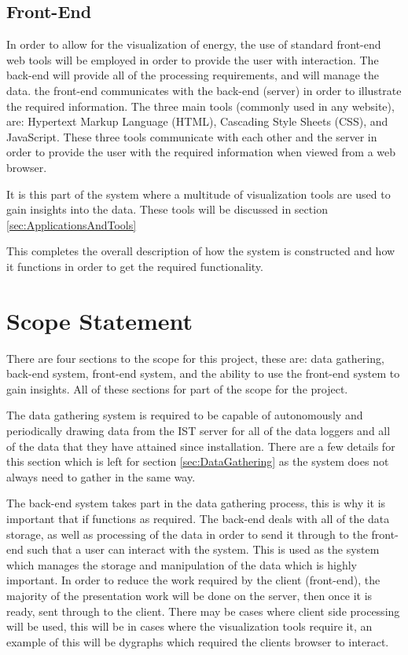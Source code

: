 \documentclass[12pt,onecolumn]{IEEEtran}
\begin{document}
\subsection{Front-End} \label{sec:FrontEnd}
In order to allow for the visualization of energy, the use of standard front-end web tools will be employed in order to provide the user with interaction. 
The back-end will provide all of the processing requirements, and will manage the data. the front-end communicates with the back-end (server) in order to illustrate the required information.
The three main tools (commonly used in any website), are: Hypertext Markup Language (HTML), Cascading Style Sheets (CSS), and JavaScript. 
These three tools communicate with each other and the server in order to provide the user with the required information when viewed from a web browser. 

It is this part of the system where a multitude of visualization tools are used to gain insights into the data. These tools will be discussed in section \ref{sec:ApplicationsAndTools}

This completes the overall description of how the system is constructed and how it functions in order to get the required functionality.


\section{Scope Statement} \label{sec:ScopeStatement}
There are four sections to the scope for this project, these are: data gathering, back-end system, front-end system, and the ability to use the front-end system to gain insights. All of these sections for part of the scope for the project. 

The data gathering system is required to be capable of autonomously and periodically drawing data from the IST server for all of the data loggers and all of the data that they have attained since installation. There are a few details for this section which is left for section \ref{sec:DataGathering} as the system does not always need to gather in the same way.

The back-end system takes part in the data gathering process, this is why it is important that if functions as required. The back-end deals with all of the data storage, as well as processing of the data in order to send it through to the front-end such that a user can interact with the system. This is used as the system which manages the storage and manipulation of the data which is highly important. 
In order to reduce the work required by the client (front-end), the majority of the presentation work will be done on the server, then once it is ready, sent through to the client. 
There may be cases where client side processing will be used, this will be in cases where the visualization tools require it, an example of this will be dygraphs which required the clients browser to interact.
\end{document}
